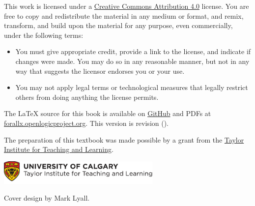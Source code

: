 \bigskip

\noindent \footnotesize This work is licensed under a \href{https://creativecommons.org/licenses/by/4.0/}{Creative Commons Attribution 4.0} license.
You are free to copy and redistribute the material in any medium or format, and  remix, transform, and build upon the material for any purpose, even commercially, under the following terms:
\begin{itemize}
\item You must give appropriate credit, provide a link to the license, and indicate if changes were made. You may do so in any reasonable manner, but not in any way that suggests the licensor endorses you or your use.
\item You may not apply legal terms or technological measures that legally restrict others from doing anything the license permits.
\end{itemize}

\vfil\normalsize\noindent The \LaTeX{} source for this book is
available on \href{https://github.com/rzach/forallx-yyc/}{GitHub} and
PDFs at
\href{https://forallx.openlogicproject.org}{forallx.openlogicproject.org}.
This version is revision \gitAbbrevHash{} (\gitAuthorDate).

\bigskip
\noindent The preparation of this textbook was made possible by a grant from the \href{https://taylorinstitute.ucalgary.ca/}{Taylor Institute for Teaching and Learning}.

\bigskip
\noindent
\href{https://taylorinstitute.ucalgary.ca/}{\includegraphics[width=8cm]{assets/ti-color}}

\bigskip
\noindent Cover design by Mark Lyall.